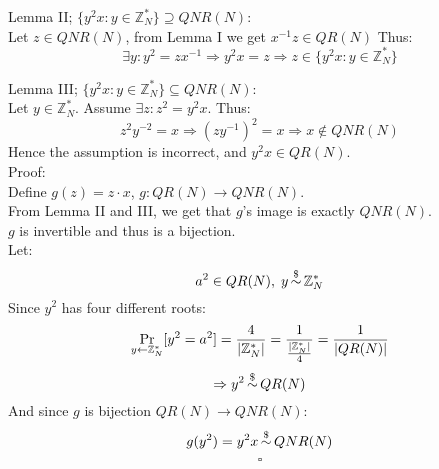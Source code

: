 Lemma II; $\{y^2x:y\in\mathbb{Z}_N^*\}\supseteq QNR(N)$:\\
Let $z\in QNR(N)$, from Lemma I we get $x^{-1}z\in QR(N)$
Thus:
\[
	\exists y: y^2=zx^{-1}
	\Rightarrow y^2x=z
	\Rightarrow z\in\{y^2x:y\in\mathbb{Z}_N^*\}	
\]

Lemma III; $\{y^2x:y\in\mathbb{Z}_N^*\}\subseteq QNR(N)$:\\
Let $y\in\mathbb{Z}_N^*$. Assume $\exists z:z^2=y^2x$.
Thus:
\[
	z^2y^{-2}=x\Rightarrow (zy^{-1})^2=x\Rightarrow x\notin QNR(N)
\]
Hence the assumption is incorrect, and $y^2x\in QR(N)$.\\

Proof:\\
Define $g(z)=z\cdot x$, $g:QR(N)\longrightarrow QNR(N)$.\\
From Lemma II and III, we get that $g$'s image is exactly $QNR(N)$.\\
$g$ is invertible and thus is a bijection.\\
Let:
\[
	a^2\in QR(N),\;y\operatorname*{\sim}^\$\mathbb{Z}_N^*
\]
Since $y^2$ has four different roots:
\[
	\operatorname*{Pr}_{y\leftarrow \mathbb{Z}_N^*}[y^2=a^2]
	=\frac{4}{|\mathbb{Z}_N^*|}
	=\frac{1}{\frac{|\mathbb{Z}_N^*|}{4}}
	=\frac{1}{|QR(N)|}
\]
\[
	\Rightarrow y^2\operatorname*{\sim}^\$QR(N)
\]
And since $g$ is bijection $QR(N)\rightarrow QNR(N)$:
\[
	g(y^2)=y^2x\operatorname*{\sim}^\$ QNR(N)
\]
\[\square\]